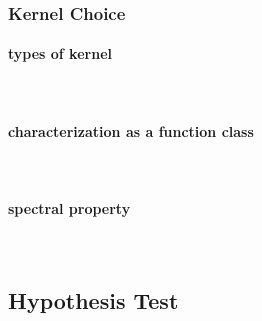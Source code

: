 \documentclass[11pt]{article}
\begin{document}
\subsubsection{{Kernel Choice}}
\paragraph{types of kernel}\mbox{}\\
\paragraph{characterization as a function class}\mbox{}\\
\paragraph{spectral property}\mbox{}\\

\subsection{{\textbf{Hypothesis Test}}}
\setcounter{equation}{0}
\renewcommand{\theequation}{2.2.\arabic{equation}}
\end{document}
